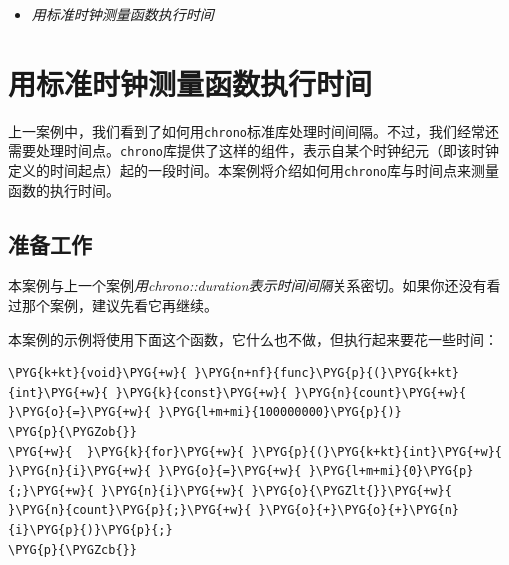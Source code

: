 
\begin{itemize}
\item \textit{用标准时钟测量函数执行时间}

\end{itemize}



\section{用标准时钟测量函数执行时间}



上一案例中，我们看到了如何用\texttt{chrono}标准库处理时间间隔。不过，我们经常还需要处理时间点。\texttt{chrono}库提供了这样的组件，表示自某个时钟纪元（即该时钟定义的时间起点）起的一段时间。本案例将介绍如何用\texttt{chrono}库与时间点来测量函数的执行时间。



\subsection{准备工作}



本案例与上一个案例\textit{用}\textit{chrono::duration表示时间间隔}关系密切。如果你还没有看过那个案例，建议先看它再继续。



本案例的示例将使用下面这个函数，它什么也不做，但执行起来要花一些时间：



\begin{codeblockbg}
\begin{Verbatim}[commandchars=\\\{\},breaklines=true,breakanywhere=true,fontsize=\codefont,xleftmargin=17bp]
\PYG{k+kt}{void}\PYG{+w}{ }\PYG{n+nf}{func}\PYG{p}{(}\PYG{k+kt}{int}\PYG{+w}{ }\PYG{k}{const}\PYG{+w}{ }\PYG{n}{count}\PYG{+w}{ }\PYG{o}{=}\PYG{+w}{ }\PYG{l+m+mi}{100000000}\PYG{p}{)}
\PYG{p}{\PYGZob{}}
\PYG{+w}{  }\PYG{k}{for}\PYG{+w}{ }\PYG{p}{(}\PYG{k+kt}{int}\PYG{+w}{ }\PYG{n}{i}\PYG{+w}{ }\PYG{o}{=}\PYG{+w}{ }\PYG{l+m+mi}{0}\PYG{p}{;}\PYG{+w}{ }\PYG{n}{i}\PYG{+w}{ }\PYG{o}{\PYGZlt{}}\PYG{+w}{ }\PYG{n}{count}\PYG{p}{;}\PYG{+w}{ }\PYG{o}{+}\PYG{o}{+}\PYG{n}{i}\PYG{p}{)}\PYG{p}{;}
\PYG{p}{\PYGZcb{}}
\end{Verbatim}
\end{codeblockbg}



